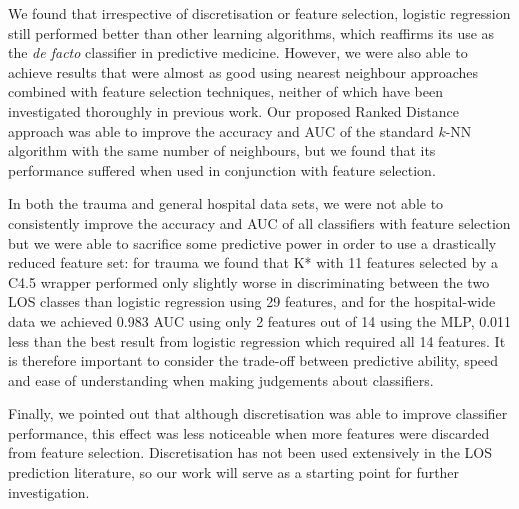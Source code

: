 We found that irrespective of discretisation or feature selection, logistic
regression still performed better than other learning algorithms, which
reaffirms its use as the \textit{de facto} classifier in predictive medicine.
However, we were also able to achieve results that were almost as good using
nearest neighbour approaches combined with feature selection techniques,
neither of which have been investigated thoroughly in previous work. Our
proposed Ranked Distance approach was able to improve the accuracy and AUC of
the standard $k$-NN algorithm with the same number of neighbours, but we found
that its performance suffered when used in conjunction with feature selection.

In both the trauma and general hospital data sets, we were not able to
consistently improve the accuracy and AUC of all
classifiers with feature selection but we were able to sacrifice some
predictive power in order to use a drastically reduced feature set: for trauma
we found that K* with 11 features selected by a C4.5 wrapper performed only
slightly worse in discriminating between the two LOS classes than logistic
regression using 29 features, and for the hospital-wide data we achieved
0.983 AUC using only 2 features out of 14 using the MLP, 0.011 less than the
best result from logistic regression which required all 14 features. It is
therefore important to consider the trade-off between predictive ability,
speed and ease of understanding when making judgements about classifiers.

Finally, we pointed out that although discretisation was able to improve
classifier performance, this effect was less noticeable when more features
were discarded from feature selection. Discretisation has not been used
extensively in the LOS prediction literature, so our work will serve as a
starting point for further investigation.
